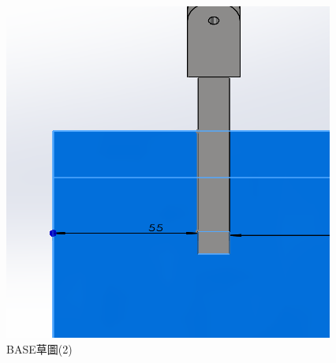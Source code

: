 \begin{figure}[h!]
    \centering
    \begin{minipage}[b]{0.6\textwidth}
        \centering
        \includegraphics[width=\textwidth,height=0.35\textheight]{./../images/6-1-28}
        \caption{BASE草圖(2)}
        \label{fig:platform}
    \end{minipage}
    \hfill
    \begin{minipage}[b]{0.35\textwidth}
        \centering

\end{minipage}
\end{figure}
